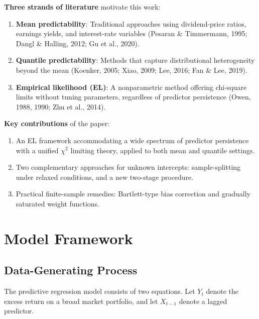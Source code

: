 \documentclass[11pt,a4paper]{article}
\theoremstyle{definition}
\theoremstyle{remark}
\begin{document}
\medskip
\noindent\textbf{Three strands of literature} motivate this work:

\begin{enumerate}[leftmargin=*]
    \item \textbf{Mean predictability}: Traditional approaches using dividend-price ratios,
    earnings yields, and interest-rate variables (Pesaran \& Timmermann, 1995;
    Dangl \& Halling, 2012; Gu et al., 2020).
    \item \textbf{Quantile predictability}: Methods that capture distributional heterogeneity
    beyond the mean (Koenker, 2005; Xiao, 2009; Lee, 2016; Fan \& Lee, 2019).
    \item \textbf{Empirical likelihood (EL)}: A nonparametric method offering chi-square
    limits without tuning parameters, regardless of predictor persistence
    (Owen, 1988, 1990; Zhu et al., 2014).
\end{enumerate}

\medskip
\noindent\textbf{Key contributions} of the paper:

\begin{enumerate}[leftmargin=*]
    \item An EL framework accommodating a wide spectrum of predictor persistence
    with a unified $\chi^2$ limiting theory, applied to both mean and quantile settings.
    \item Two complementary approaches for unknown intercepts:
    sample-splitting under relaxed conditions, and a new two-stage procedure.
    \item Practical finite-sample remedies: Bartlett-type bias correction and
    gradually saturated weight functions.
\end{enumerate}

\section{Model Framework}

\subsection{Data-Generating Process}

The predictive regression model consists of two equations.
Let $Y_t$ denote the excess return on a broad market portfolio,
and let $X_{t-1}$ denote a lagged predictor.
\end{document}
